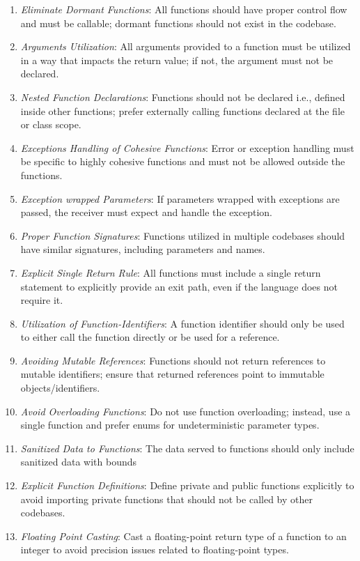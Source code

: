 \documentclass[9pt]{IEEEtran} %
\begin{document}
\begin{enumerate}
  \item \textit{Eliminate Dormant Functions}: All functions should have proper control flow and must be callable; dormant functions should not exist in the codebase.
  \item \textit{Arguments Utilization}: All arguments provided to a function must be utilized in a way that impacts the return value; if not, the argument must not be declared.
  \item \textit{Nested Function Declarations}: Functions should not be declared i.e., defined inside other functions; prefer externally calling functions declared at the file or class scope.
  \item \textit{Exceptions Handling of Cohesive Functions}: Error or exception handling must be specific to highly cohesive functions and must not be allowed outside the functions. 
  \item \textit{Exception wrapped Parameters}: If parameters wrapped with exceptions are passed, the receiver must expect and handle the exception.
  \item \textit{Proper Function Signatures}: Functions utilized in multiple codebases should have similar signatures, including parameters and names.
  \item \textit{Explicit Single Return Rule}: All functions must include a single return statement to explicitly provide an exit path, even if the language does not require it.
  \item \textit{Utilization of Function-Identifiers}: A function identifier should only be used to either call the function directly or be used for a reference.
  \item \textit{Avoiding Mutable References}: Functions should not return references to mutable identifiers; ensure that returned references point to immutable objects/identifiers.
  \item \textit{Avoid Overloading Functions}: Do not use function overloading; instead, use a single function and prefer enums for undeterministic parameter types.
  \item \textit{Sanitized Data to Functions}: The data served to functions should only include sanitized data with bounds 
  \item \textit{Explicit Function Definitions}: Define private and public functions explicitly to avoid importing private functions that should not be called by other codebases.
  \item \textit{Floating Point Casting}: Cast a floating-point return type of a function to an integer to avoid precision issues related to floating-point types.

\end{enumerate}
\end{document}
